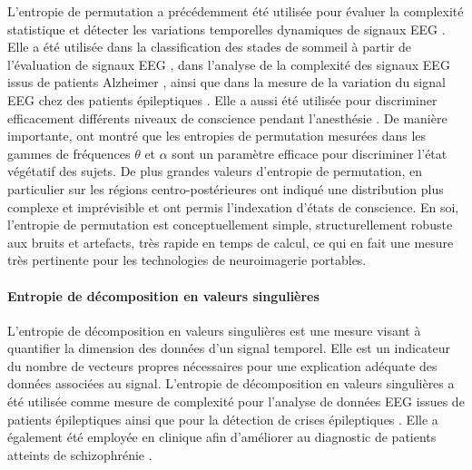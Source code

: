 L'entropie de permutation a précédemment été utilisée pour évaluer la complexité statistique et détecter les variations temporelles dynamiques de signaux EEG \citep{li2008using}. 
Elle a été utilisée dans la classification des stades de sommeil à partir de l'évaluation de signaux EEG \citep{bandt2017new}, dans l'analyse de la complexité des signaux EEG issus de patients Alzheimer \citep{morabito2012multivariate}, ainsi que dans la mesure de la variation du signal EEG chez des patients épileptiques \citep{li2007predictability, li2014using, zhu2013epileptogenic}. 
Elle a aussi été utilisée pour discriminer efficacement différents niveaux de conscience pendant l'anesthésie \citep{jordan2008electroencephalographic, li2008using, li2010multiscale, li2013parameter, liang2015eeg, olofsen2008permutation}. 
De manière importante, \cite{sitt2014large} ont montré que les entropies de permutation mesurées dans les gammes de fréquences $\theta$ et $\alpha$ sont un paramètre efficace pour discriminer l'état végétatif des sujets. 
De plus grandes valeurs d'entropie de permutation, en particulier sur les régions centro-postérieures ont indiqué une distribution plus complexe et imprévisible et ont permis l'indexation d'états de conscience. 
En soi, l'entropie de permutation est conceptuellement simple, structurellement robuste aux bruits et artefacts, très rapide en temps de calcul, ce qui en fait une mesure très pertinente pour les technologies de neuroimagerie portables. 

\paragraph{Entropie de décomposition en valeurs singulières\\}
\label{sven}

L'entropie de décomposition en valeurs singulières \citep{varshavsky2006novel, banerjee2014feature} est une mesure visant à quantifier la dimension des données d'un signal temporel. 
Elle est un indicateur du nombre de vecteurs propres nécessaires pour une explication adéquate des données associées au signal. 
L'entropie de décomposition en valeurs singulières a été utilisée comme mesure de complexité pour l'analyse de données EEG issues de patients épileptiques \citep{colominas2017time, greene2008comparison, prabhakar2015performance, satapathy2017eeg} ainsi que pour la détection de crises épileptiques \citep{dhanka2020comparative, wu2020detecting}. 
Elle a également été employée en clinique afin d'améliorer au diagnostic de patients atteints de schizophrénie \citep{krishnan2020schizophrenia}.

